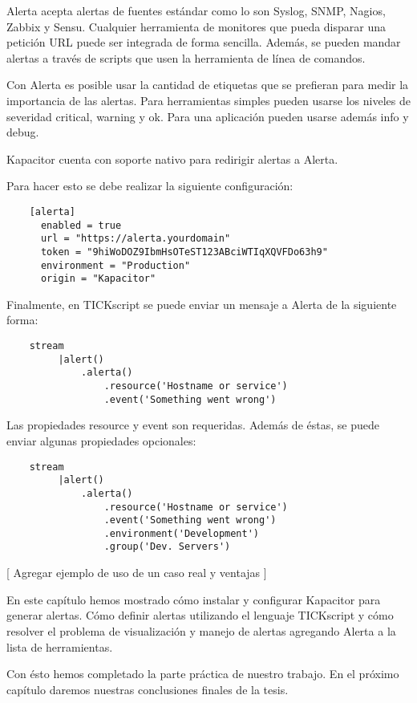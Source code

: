 Alerta acepta alertas de fuentes estándar como lo son Syslog, SNMP, Nagios, Zabbix y Sensu. Cualquier herramienta de monitores que pueda disparar una petición URL puede ser integrada de forma sencilla. Además, se pueden mandar alertas a través de scripts que usen la herramienta de línea de comandos.

Con Alerta es posible usar la cantidad de etiquetas que se prefieran para medir la importancia de las alertas. Para herramientas simples pueden usarse los niveles de severidad critical, warning y ok. Para una aplicación pueden usarse además info y debug.

Kapacitor cuenta con soporte nativo para redirigir alertas a Alerta.

Para hacer esto se debe realizar la siguiente configuración:

\begin{lstlisting}
    [alerta]
      enabled = true
      url = "https://alerta.yourdomain"
      token = "9hiWoDOZ9IbmHsOTeST123ABciWTIqXQVFDo63h9"
      environment = "Production"
      origin = "Kapacitor"
\end{lstlisting}

Finalmente, en TICKscript se puede enviar un mensaje a Alerta de la siguiente forma:

\begin{lstlisting}
    stream
         |alert()
             .alerta()
                 .resource('Hostname or service')
                 .event('Something went wrong')
\end{lstlisting}

Las propiedades resource y event son requeridas. Además de éstas, se puede enviar algunas propiedades opcionales:

\begin{lstlisting}
    stream
         |alert()
             .alerta()
                 .resource('Hostname or service')
                 .event('Something went wrong')
                 .environment('Development')
                 .group('Dev. Servers')
\end{lstlisting}

[ Agregar ejemplo de uso de un caso real y ventajas ]

En este capítulo hemos mostrado cómo instalar y configurar Kapacitor para generar alertas. Cómo definir alertas utilizando el lenguaje TICKscript y cómo resolver el problema de visualización y manejo de alertas agregando Alerta a la lista de herramientas.

Con ésto hemos completado la parte práctica de nuestro trabajo. En el próximo capítulo daremos nuestras conclusiones finales de la tesis.

